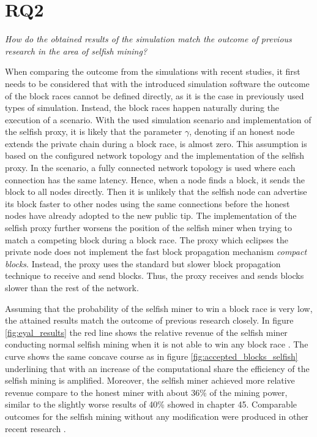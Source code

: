 \section{RQ2}

\textit{How do the obtained results of the simulation match the outcome of previous research in the area of selfish mining?}

When comparing the outcome from the simulations with recent studies, it first needs to be considered that with the introduced simulation software the outcome of the block races cannot be defined directly, as it is the case in previously used types of simulation.
Instead, the block races happen naturally during the execution of a scenario.
With the used simulation scenario and implementation of the selfish proxy, it is likely that the parameter $\gamma$, denoting if an honest node extends the private chain during a block race, is almost zero.
This assumption is based on the configured network topology and the implementation of the selfish proxy.
In the scenario, a fully connected network topology is used where each connection has the same latency.
Hence, when a node finds a block, it sends the block to all nodes directly.
Then it is unlikely that the selfish node can advertise its block faster to other nodes using the same connections before the honest nodes have already adopted to the new public tip.
The implementation of the selfish proxy further worsens the position of the selfish miner when trying to match a competing block during a block race.
The proxy which eclipses the private node does not implement the fast block propagation mechanism \textit{compact blocks}.
Instead, the proxy uses the standard but slower block propagation technique to receive and send blocks.
Thus, the proxy receives and sends blocks slower than the rest of the network.

Assuming that the probability of the selfish miner to win a block race is very low, the attained results match the outcome of previous research closely.
In figure \ref{fig:eyal_results} the red line shows the relative revenue of the selfish miner conducting normal selfish mining when it is not able to win any block race \cite{eyal2014majority}.
The curve shows the same concave course as in figure \ref{fig:accepted_blocks_selfish} underlining that with an increase of the computational share the efficiency of the selfish mining is amplified.
Moreover, the selfish miner achieved more relative revenue compare to the honest miner with about 36\% of the mining power, similar to the slightly worse results of 40\% showed in chapter 45.
Comparable outcomes for the selfish mining without any modification were produced in other recent research \cite{nayak2016stubborn, sapirshtein2016optimal}.

